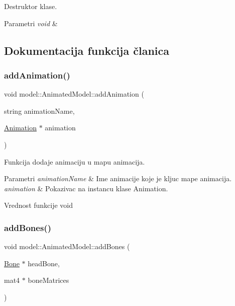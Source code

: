 Destruktor klase. 


\begin{DoxyParams}{Parametri}
{\em void} & \\
\hline
\end{DoxyParams}


\subsection{Dokumentacija funkcija članica}
\mbox{\label{classmodel_1_1AnimatedModel_a287cf08a5abf805da23895b2fd0dabff}} 
\subsubsection{\texorpdfstring{add\+Animation()}{addAnimation()}}
{\footnotesize\ttfamily void model\+::\+Animated\+Model\+::add\+Animation (\begin{DoxyParamCaption}\item[{string}]{animation\+Name,  }\item[{\hyperlink{classanimation_1_1Animation}{Animation} $\ast$}]{animation }\end{DoxyParamCaption})}



Funkcija dodaje animaciju u mapu animacija. 


\begin{DoxyParams}{Parametri}
{\em animation\+Name} & Ime animacije koje je kljuc mape animacija. \\
\hline
{\em animation} & Pokazivac na instancu klase Animation. \\
\hline
\end{DoxyParams}
\begin{DoxyReturn}{Vrednost funkcije}
void 
\end{DoxyReturn}
\mbox{\label{classmodel_1_1AnimatedModel_a4da32dc14c679424f45027fc300f3905}} 
\subsubsection{\texorpdfstring{add\+Bones()}{addBones()}}
{\footnotesize\ttfamily void model\+::\+Animated\+Model\+::add\+Bones (\begin{DoxyParamCaption}\item[{\hyperlink{classmodel_1_1Bone}{Bone} $\ast$}]{head\+Bone,  }\item[{mat4 $\ast$}]{bone\+Matrices }\end{DoxyParamCaption})}



